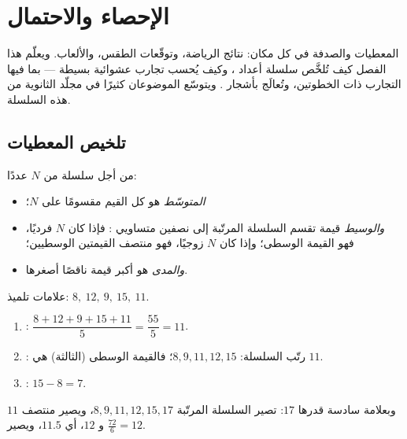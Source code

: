 \chapter{الإحصاء والاحتمال}\label{ch:g9:statproba}

المعطيات والصدفة في كل مكان: نتائج الرياضة، وتوقّعات الطقس،
والألعاب. ويعلّم هذا الفصل كيف تُلخَّص سلسلة أعداد
  ، وكيف يُحسب  تجارب
عشوائية بسيطة --- بما فيها التجارب ذات الخطوتين، وتُعالَج بأشجار
. ويتوسّع الموضوعان كثيرًا في مجلّد الثانوية من هذه
السلسلة.

\section{تلخيص المعطيات}

\begin{definition}\label{def:g9:statproba:indicators}
من أجل سلسلة من $N$ عددًا:
\begin{itemize}
  \item \emph{المتوسّط} هو  كل القيم مقسومًا
        على $N$؛
  \item \emph{والوسيط} قيمة تقسم السلسلة المرتّبة إلى
        نصفين متساويي : فإذا كان $N$ فرديًا، فهو القيمة
        الوسطى؛ وإذا كان $N$ زوجيًا، فهو منتصف القيمتين
        الوسطيين؛
  \item \emph{والمدى} هو أكبر قيمة ناقصًا أصغرها.
\end{itemize}
\end{definition}

\begin{example}\label{ex:g9:statproba:indicators}
علامات تلميذ: $8,\ 12,\ 9,\ 15,\ 11$.
\begin{enumerate}
  \item {}: $\dfrac{8 + 12 + 9 + 15 + 11}{5} = \dfrac{55}{5} = 11$.
  \item {}: رتّب السلسلة: $8, 9, 11, 12, 15$؛ فالقيمة
        الوسطى (الثالثة) هي $11$.
  \item {}: $15 - 8 = 7$.
\end{enumerate}
وبعلامة سادسة قدرها $17$: تصير السلسلة المرتّبة
$8, 9, 11, 12, 15, 17$، ويصير  منتصف $11$ و $12$، أي
$11.5$، ويصير  $\frac{72}{6} = 12$.
\end{example}

